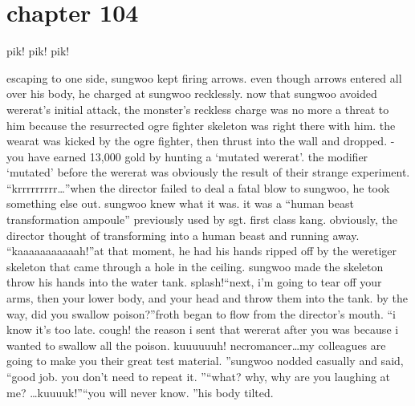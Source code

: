 \section{chapter 104}

                            pik! pik! pik!




escaping to one side, sungwoo kept firing arrows.
 even though arrows entered all over his body, he charged at sungwoo recklessly.
now that sungwoo avoided wererat’s initial attack, the monster’s reckless charge was no more a threat to him because the resurrected ogre fighter skeleton was right there with him.
the wearat was kicked by the ogre fighter, then thrust into the wall and dropped.
-you have earned 13,000 gold by hunting a ‘mutated wererat’.
the modifier ‘mutated’ before the wererat was obviously the result of their strange experiment.
“krrrrrrrrr…”when the director failed to deal a fatal blow to sungwoo, he took something else out.
sungwoo knew what it was.
 it was a “human beast transformation ampoule” previously used by sgt.
 first class kang.
 obviously, the director thought of transforming into a human beast and running away.
“kaaaaaaaaaaah!”at that moment, he had his hands ripped off by the weretiger skeleton that came through a hole in the ceiling.
 sungwoo made the skeleton throw his hands into the water tank.
splash!“next, i’m going to tear off your arms, then your lower body, and your head and throw them into the tank.
 by the way, did you swallow poison?”froth began to flow from the director’s mouth.
“i know it’s too late.
 cough! the reason i sent that wererat after you was because i wanted to swallow all the poison.
 kuuuuuuh! necromancer…my colleagues are going to make you their great test material.
”sungwoo nodded casually and said, “good job.
 you don’t need to repeat it.
”“what? why, why are you laughing at me? …kuuuuk!”“you will never know.
”his body tilted.


